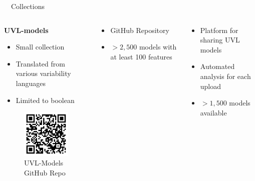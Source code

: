 \documentclass[
	aspectratio=169, %
	8pt, %
	nosectionframes, %
]{beamer}
\newcommand{\inlinesubtitle}[1]{\textcolor{gray!60}{~{}~#1}}
\begin{document}
\begin{frame}{\insertsection \inlinesubtitle{Collections}}
    \vspace{0.4cm}
    \begin{columns}[t]
		\begin{column}{0.3\textwidth}
			\textbf{UVL-models}
            \begin{itemize}
                \item Small collection
                \item Translated from various variability languages
                \item Limited to boolean
            \end{itemize}
            \begin{figure}
                \centering
                \includegraphics[width=3cm]{pics/qr/collection.pdf}
                \caption{UVL-Models GitHub Repo}
            \end{figure}
		\end{column}%
		\begin{column}{0.3\textwidth}
            \begin{itemize}
                \item GitHub Repository
                \item $>2,500$ models with at least 100 features
            \end{itemize}
            \begin{figure}[htbp]
                \centering
                
            \end{figure}
		\end{column}
        \begin{column}{0.3\textwidth}
            \begin{itemize}
                \item Platform for sharing UVL models
                \item Automated analysis for each upload
                \item $>1,500$ models available  
            \end{itemize}
        \end{column}
	\end{columns}
\end{frame}
\end{document}
